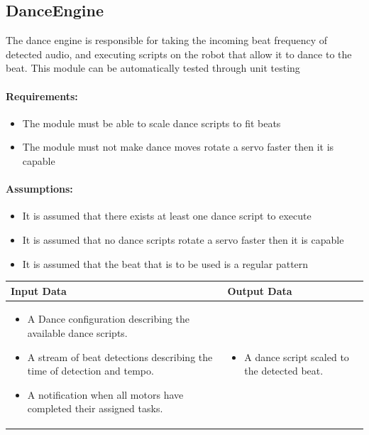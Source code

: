 \documentclass[english,12pt]{scrartcl}
\begin{document}
	\subsection{DanceEngine}
		The dance engine is responsible for taking the incoming beat frequency of detected audio, and executing scripts on the robot that allow it to dance to the beat.
		This module can be automatically tested through unit testing
		
		\paragraph{Requirements:}
		\begin{itemize}
			\item The module must be able to scale dance scripts to fit beats
			\item The module must not make dance moves rotate a servo faster then it is capable
		\end{itemize}
		
		\paragraph{Assumptions:}
		\begin{itemize}
			\item It is assumed that there exists at least one dance script to execute
			\item It is assumed that no dance scripts rotate a servo faster then it is capable
			\item It is assumed that the beat that is to be used is a regular pattern
		\end{itemize}
		
		\begin{tabular}{p{7cm}|p{7cm}}
    			\textbf{Input Data} & \textbf{Output Data} \\ \hline
			\begin{itemize}
				\item A Dance configuration describing the available dance scripts.
				\item A stream of beat detections describing the time of detection and tempo.
				\item A notification when all motors have completed their assigned tasks.
			\end{itemize}
			&
			\begin{itemize}
				\item A dance script scaled to the detected beat.
			\end{itemize}
		\end{tabular}
\end{document}
